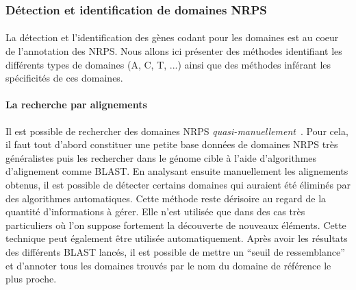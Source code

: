 \documentclass[12pt,french,twoside]{report}
\begin{document}
\subsubsection{Détection et identification de domaines NRPS}

\paragraph{}La détection et l'identification des gènes codant pour les domaines est au coeur de l'annotation des NRPS.
Nous allons ici présenter des méthodes identifiant les différents types de domaines (A, C, T, ...) ainsi que des méthodes inférant les spécificités de ces domaines.

\paragraph{La recherche par alignements}
Il est possible de rechercher des domaines NRPS \textit{quasi-manuellement}~\cite{bachmann_chapter_2009}.
Pour cela, il faut tout d'abord constituer une petite base données de domaines NRPS très généralistes puis les rechercher dans le génome cible à l'aide d'algorithmes d'alignement comme BLAST.
En analysant ensuite manuellement les alignements obtenus, il est possible de détecter certains domaines qui auraient été éliminés par des algorithmes automatiques.
Cette méthode reste dérisoire au regard de la quantité d'informations à gérer.
Elle n'est utilisée que dans des cas très particuliers où l'on suppose fortement la découverte de nouveaux éléments.
Cette technique peut également être utilisée automatiquement.
Après avoir les résultats des différents BLAST lancés, il est possible de mettre un ``seuil de ressemblance'' et d'annoter tous les domaines trouvés par le nom du domaine de référence le plus proche.

\end{document}
